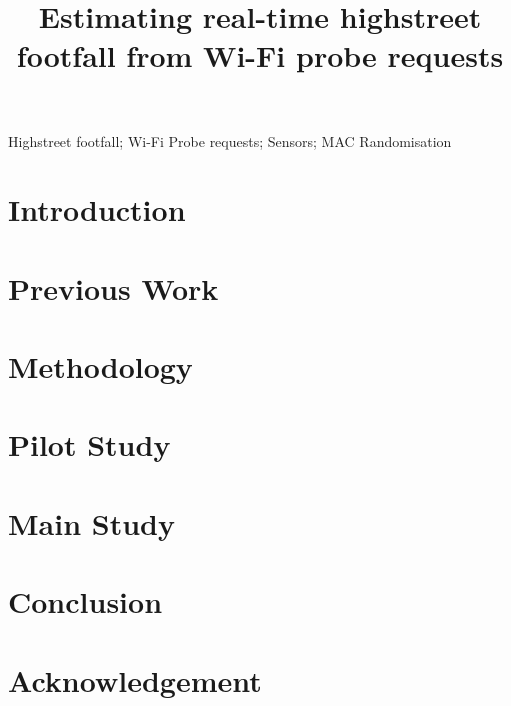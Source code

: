 \documentclass[]{interact}
\theoremstyle{plain}
\theoremstyle{definition}
\theoremstyle{remark}
\begin{document}
	\title{Estimating real-time highstreet footfall from Wi-Fi probe requests}
	\author{
	}
	\maketitle
	\begin{abstract}
		 \end{abstract}
	\begin{keywords}
		Highstreet footfall; Wi-Fi Probe requests; Sensors; MAC Randomisation \end{keywords}
	\section{Introduction}\label{introduction}
		
	\section{Previous Work}\label{previous_work}
		
	\section{Methodology}\label{methodology}
		
	\section{Pilot Study}\label{pilot_study}
		
	\section{Main Study}\label{main_study}
		
	\section{Conclusion}\label{conclusion}
		
	\section*{Acknowledgement}
		
	 
\end{document}

